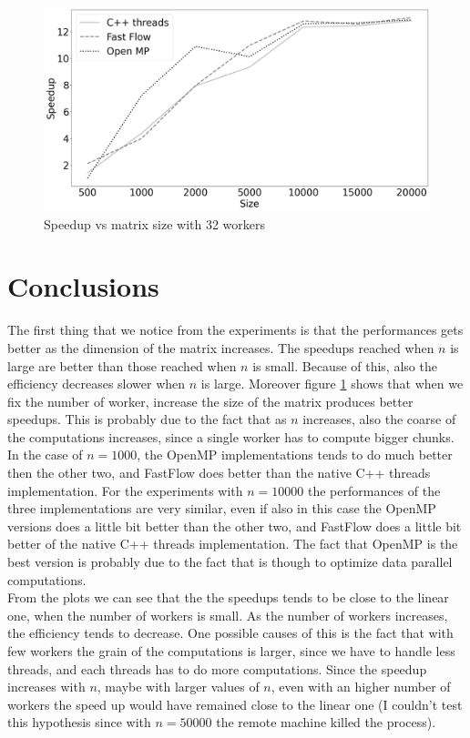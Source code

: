 \documentclass[12pt]{article}
\begin{document}
	\begin{figure}[H]
		\centering
		\includegraphics[width=13cm]{./images/speedup_vs_size}
		\caption{Speedup vs matrix size with 32 workers}
		\label{fig:speed_vs_size}
	\end{figure}


	\section{Conclusions}
	The first thing that we notice from the experiments is that the performances gets better as the dimension of the matrix increases. The speedups reached when $n$ is large are better than those reached when $n$ is small. Because of this, also the efficiency decreases slower when $n$ is large. Moreover figure \ref{fig:speed_vs_size} shows that when we fix the number of worker, increase the size of the matrix produces better speedups. This is probably due to the fact that as $n$ increases, also the coarse of the computations increases, since a single worker has to compute bigger chunks.\\
	In the case of $n = 1000$, the OpenMP implementations tends to do much better then the other two, and FastFlow does better than the native C++ threads implementation. For the experiments with $n = 10000$ the performances of the three implementations are very similar, even if also in this case the OpenMP versions does a little bit better than the other two, and FastFlow does a little bit better of the native C++ threads implementation. The fact that OpenMP is the best version is probably due to the fact that is though to optimize data parallel computations. \\
	From the plots we can see that the the speedups tends to be close to the linear one, when the number of workers is small. As the number of workers increases, the efficiency tends to decrease. One possible causes of this is the fact that with few workers the grain of the computations is larger, since we have to handle less threads, and each threads has to do more computations. Since the speedup increases with $n$, maybe with larger values of $n$, even with an higher number of workers the speed up would have remained close to the linear one (I couldn't test this hypothesis since with $n = 50000$ the remote machine killed the process).
	
	
\end{document}
